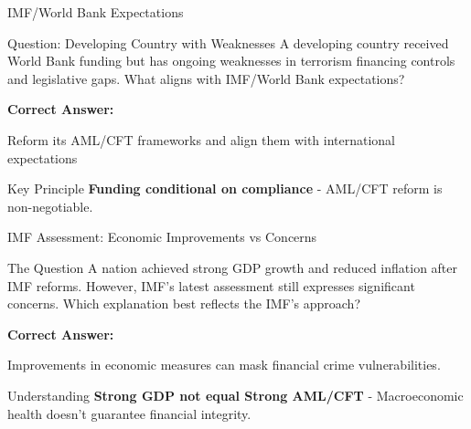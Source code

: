 \documentclass{beamer}
\begin{document}
\begin{frame}{IMF/World Bank Expectations}
\begin{block}{Question: Developing Country with Weaknesses}
\small{A developing country received World Bank funding but has ongoing weaknesses in terrorism financing controls and legislative gaps. What aligns with IMF/World Bank expectations?}
\end{block}

\vspace{0.3cm}
\textcolor{correct}{\textbf{Correct Answer:}}
\begin{center}
\Large{Reform its AML/CFT frameworks and align them with international expectations}
\end{center}

\begin{block}{Key Principle}
\textbf{Funding conditional on compliance} - AML/CFT reform is non-negotiable.
\end{block}
\end{frame}

\begin{frame}{IMF Assessment: Economic Improvements vs Concerns}
\begin{block}{The Question}
\small{A nation achieved strong GDP growth and reduced inflation after IMF reforms. However, IMF's latest assessment still expresses significant concerns. Which explanation best reflects the IMF's approach?}
\end{block}

\vspace{0.3cm}
\textcolor{correct}{\textbf{Correct Answer:}}
\begin{center}
\Large{Improvements in economic measures can mask financial crime vulnerabilities.}
\end{center}

\begin{block}{Understanding}
\textbf{Strong GDP not equal Strong AML/CFT} - Macroeconomic health doesn't guarantee financial integrity.
\end{block}
\end{frame}
\end{document}
